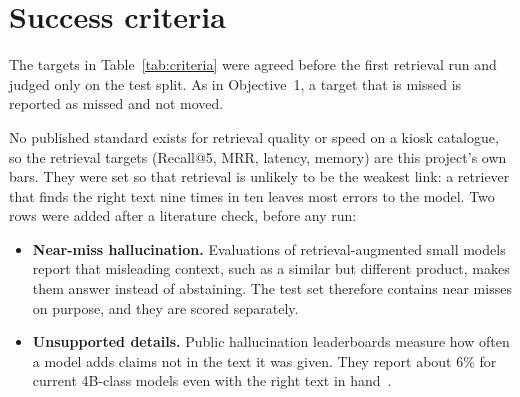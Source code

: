 \documentclass[11pt,a4paper]{article}
\begin{document}
\section{Success criteria}\label{sec:criteria}

The targets in Table~\ref{tab:criteria} were agreed before the first retrieval run and judged only on the test split.
As in Objective~1, a target that is missed is reported as missed and not moved.

No published standard exists for retrieval quality or speed on a kiosk catalogue, so the retrieval targets (Recall@5,
MRR, latency, memory) are this project's own bars. They were set so that retrieval is unlikely to be the weakest link:
a retriever that finds the right text nine times in ten leaves most errors to the model. Two rows were added after a
literature check, before any run:
\begin{itemize}
  \item \textbf{Near-miss hallucination.} Evaluations of retrieval-augmented small models report that misleading
        context, such as a similar but different product, makes them answer instead of abstaining. The test set
        therefore contains near misses on purpose, and they are scored separately.
  \item \textbf{Unsupported details.} Public hallucination leaderboards measure how often a model adds claims not in the
        text it was given. They report about 6\% for current 4B-class models even with the right text in
        hand~\cite{vectara}.
\end{itemize}
\end{document}
